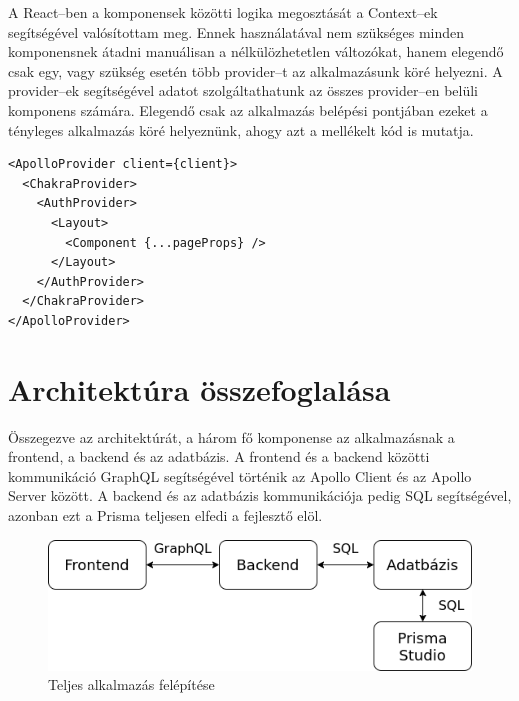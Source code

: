 A React–ben a komponensek közötti logika megosztását a Context–ek segítségével valósítottam meg.
Ennek használatával nem szükséges minden komponensnek átadni manuálisan a nélkülözhetetlen változókat, hanem elegendő csak egy, vagy szükség esetén több provider–t az alkalmazásunk köré helyezni.
A provider–ek segítségével adatot szolgáltathatunk az összes provider–en belüli komponens számára.
Elegendő csak az alkalmazás belépési pontjában ezeket a tényleges alkalmazás köré helyeznünk, ahogy azt a mellékelt kód is mutatja.

\begin{lstlisting}[style=ES6]    
<ApolloProvider client={client}>
  <ChakraProvider>
    <AuthProvider>
      <Layout>
        <Component {...pageProps} />
      </Layout>
    </AuthProvider>
  </ChakraProvider>
</ApolloProvider>
\end{lstlisting}


\section{Architektúra összefoglalása}
Összegezve az architektúrát, a három fő komponense az alkalmazásnak a frontend, a backend és az adatbázis.
A frontend és a backend közötti kommunikáció GraphQL segítségével történik az Apollo Client és az Apollo Server között.
A backend és az adatbázis kommunikációja pedig SQL segítségével, azonban ezt a Prisma teljesen elfedi a fejlesztő elöl.

\begin{figure}[!ht]
  \centering
  \includegraphics[width=150mm, keepaspectratio]{figures/architecture.png}
  \caption{Teljes alkalmazás felépítése}
  \label{fig:architecture}
\end{figure}